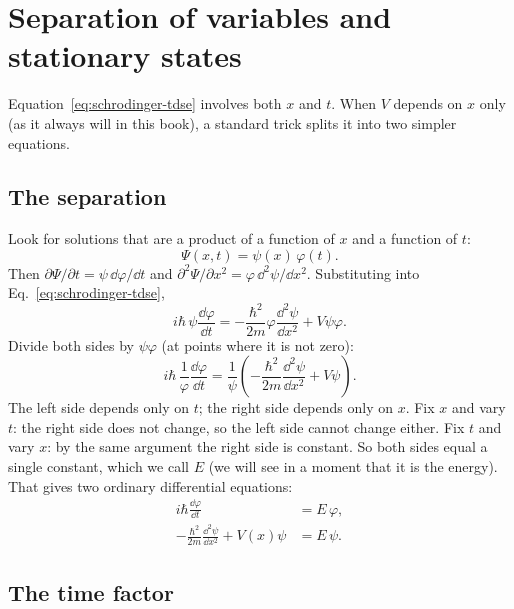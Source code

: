 \section{Separation of variables and stationary states}\label{sec:schrodinger-separation}

Equation~\eqref{eq:schrodinger-tdse} involves both $x$ and $t$. When $V$ depends on $x$ only (as it always will in this book), a standard trick splits it into two simpler equations.

\subsection{The separation}

Look for solutions that are a product of a function of $x$ and a function of $t$:
\begin{equation}
\Psi(x,t)=\psi(x)\,\varphi(t).
\label{eq:schrodinger-sep}
\end{equation}
Then $\partial\Psi/\partial t=\psi\,\dd\varphi/\dd t$ and $\partial^2\Psi/\partial x^2=\varphi\,\dd^2\psi/\dd x^2$. Substituting into Eq.~\eqref{eq:schrodinger-tdse},
\[
i\hbar\,\psi\frac{\dd\varphi}{\dd t}=-\frac{\hbar^2}{2m}\varphi\frac{\dd^2\psi}{\dd x^2}+V\psi\varphi.
\]
Divide both sides by $\psi\varphi$ (at points where it is not zero):
\begin{equation}
i\hbar\,\frac{1}{\varphi}\frac{\dd\varphi}{\dd t}
=\frac{1}{\psi}\left(-\frac{\hbar^2}{2m}\frac{\dd^2\psi}{\dd x^2}+V\psi\right).
\end{equation}
The left side depends only on $t$; the right side depends only on $x$. Fix $x$ and vary $t$: the right side does not change, so the left side cannot change either. Fix $t$ and vary $x$: by the same argument the right side is constant. So both sides equal a single constant, which we call $E$ (we will see in a moment that it is the energy). That gives two ordinary differential equations:
\begin{align}
i\hbar\frac{\dd\varphi}{\dd t}&=E\,\varphi,\label{eq:schrodinger-time-ode}\\
-\frac{\hbar^2}{2m}\frac{\dd^2\psi}{\dd x^2}+V(x)\psi&=E\,\psi.\label{eq:schrodinger-tise}
\end{align}

\subsection{The time factor}

